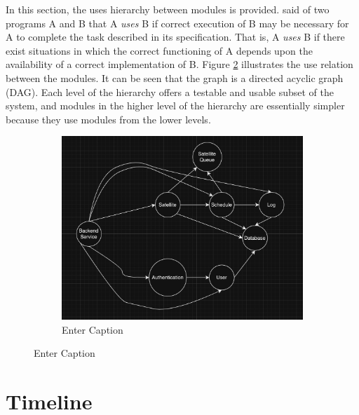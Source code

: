 \documentclass[12pt, titlepage]{article}
\begin{document}
In this section, the uses hierarchy between modules is
provided. \citet{Parnas1978} said of two programs A and B that A {\em uses} B if
correct execution of B may be necessary for A to complete the task described in
its specification. That is, A {\em uses} B if there exist situations in which
the correct functioning of A depends upon the availability of a correct
implementation of B.  Figure \ref{FigUH} illustrates the use relation between
the modules. It can be seen that the graph is a directed acyclic graph
(DAG). Each level of the hierarchy offers a testable and usable subset of the
system, and modules in the higher level of the hierarchy are essentially simpler
because they use modules from the lower levels.



\begin{figure}[H]
\centering
\begin{figure}
    \centering
    \includegraphics[width=1\linewidth]{hierarchy_dag.png}
    \caption{Enter Caption}
    \label{Use hierarchy among modules}
\end{figure}
\label{FigUH}
\end{figure}

\section{Timeline}
\end{document}
